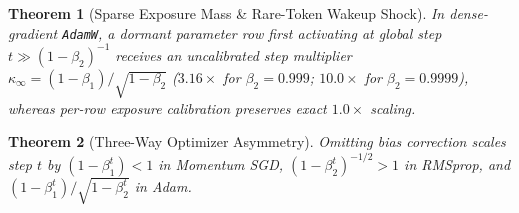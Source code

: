 \documentclass[11pt]{article}
\newtheorem{theorem}{Theorem}
\begin{document}
\begin{theorem}[Sparse Exposure Mass \& Rare-Token Wakeup Shock]
In dense-gradient \texttt{AdamW}, a dormant parameter row first activating at global step $t \gg (1-\beta_2)^{-1}$ receives an uncalibrated step multiplier $\kappa_\infty = (1-\beta_1)/\sqrt{1-\beta_2}$ ($3.16\times$ for $\beta_2=0.999$; $10.0\times$ for $\beta_2=0.9999$), whereas per-row exposure calibration preserves exact $1.0\times$ scaling.
\end{theorem}

\begin{theorem}[Three-Way Optimizer Asymmetry]
Omitting bias correction scales step $t$ by $(1-\beta_1^t) < 1$ in Momentum SGD, $(1-\beta_2^t)^{-1/2} > 1$ in RMSprop, and $(1-\beta_1^t)/\sqrt{1-\beta_2^t}$ in Adam.
\end{theorem}



\end{document}
